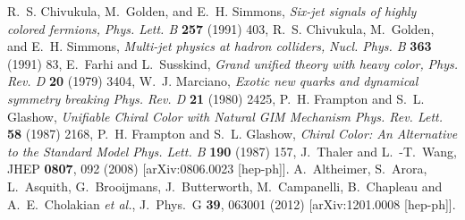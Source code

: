 \documentclass{JINST}
\begin{document}
\begin{thebibliography}{9}

R.~S. Chivukula, M.~Golden, and E.~H. Simmons, 
\emph{Six-jet signals of highly colored fermions,} \textit{ Phys. Lett. B} \textbf{ 257}  (1991) 403,
%
R.~S. Chivukula, M.~Golden, and E.~H. Simmons, 
\emph{Multi-jet physics at hadron colliders,} \textit{ Nucl. Phys. B} \textbf{ 363} (1991)  83,
%
E.~Farhi and L.~Susskind,
\emph{Grand unified theory with heavy color,} \textit{ Phys. Rev. D} \textbf{ 20} (1979) 3404,
%
W.~J. Marciano, 
\emph{Exotic new quarks and dynamical symmetry breaking} 
\textit{ Phys. Rev. D} \textbf{ 21} (1980) 2425,
%
P.~H. Frampton and S.~L. Glashow, 
\emph{Unifiable Chiral Color  with Natural {GIM} Mechanism}
 \textit{ Phys. Rev. Lett.} \textbf{ 58}  (1987) 2168,
%
 P.~H. Frampton and S.~L. Glashow, 
\emph{Chiral Color: An   Alternative to the Standard Model} 
\textit{ Phys. Lett. B} \textbf{ 190}  (1987) 157,
%
  J.~Thaler and L.~-T.~Wang,
  JHEP {\bf 0807}, 092 (2008)
  [arXiv:0806.0023 [hep-ph]].
%
%
  A.~Altheimer, S.~Arora, L.~Asquith, G.~Brooijmans, J.~Butterworth, M.~Campanelli, B.~Chapleau and A.~E.~Cholakian {\it et al.},
  J.\ Phys.\ G {\bf 39}, 063001 (2012)
  [arXiv:1201.0008 [hep-ph]].
%
%

\end{thebibliography}
\end{document}
